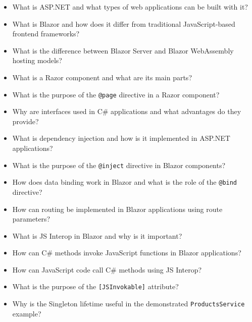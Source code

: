\begin{itemize}
    \item What is ASP.NET and what types of web applications can be built with it?
    
    \item What is Blazor and how does it differ from traditional JavaScript-based frontend frameworks?
    
    \item What is the difference between Blazor Server and Blazor WebAssembly hosting models?
    
    \item What is a Razor component and what are its main parts?
    
    \item What is the purpose of the \texttt{@page} directive in a Razor component?
    
    \item Why are interfaces used in C\# applications and what advantages do they provide?
    
    \item What is dependency injection and how is it implemented in ASP.NET applications?
    
    \item What is the purpose of the \texttt{@inject} directive in Blazor components?
    
    \item How does data binding work in Blazor and what is the role of the \texttt{@bind} directive?
    
    \item How can routing be implemented in Blazor applications using route parameters?
    
    \item What is JS Interop in Blazor and why is it important?
    
    \item How can C\# methods invoke JavaScript functions in Blazor applications?
    
    \item How can JavaScript code call C\# methods using JS Interop?
    
    \item What is the purpose of the \texttt{[JSInvokable]} attribute?
    
    \item Why is the Singleton lifetime useful in the demonstrated \texttt{ProductsService} example?
\end{itemize}

